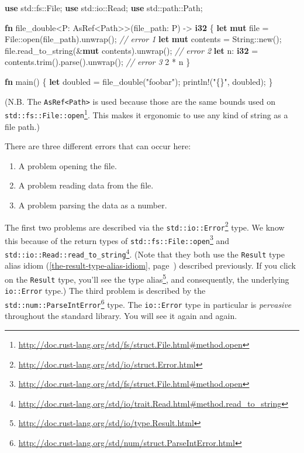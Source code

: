 \documentclass[a4paper,]{book}
\renewcommand*{\hyperref}[2][\ar]{%
  \def\ar{#2}%
  #2 (\autoref{#1}, page~\pageref{#1})}
\newenvironment{Shaded}{\begin{snugshade}}{\end{snugshade}}
\newcommand{\KeywordTok}[1]{\textcolor[rgb]{0.13,0.29,0.53}{\textbf{{#1}}}}
\newcommand{\DecValTok}[1]{\textcolor[rgb]{0.00,0.00,0.81}{{#1}}}
\newcommand{\StringTok}[1]{\textcolor[rgb]{0.31,0.60,0.02}{{#1}}}
\newcommand{\CommentTok}[1]{\textcolor[rgb]{0.56,0.35,0.01}{\textit{{#1}}}}
\newcommand{\OtherTok}[1]{\textcolor[rgb]{0.56,0.35,0.01}{{#1}}}
\newcommand{\NormalTok}[1]{{#1}}
\renewcommand{\href}[2]{#2\footnote{\url{#1}}}
\begin{document}
\begin{Shaded}
\begin{Highlighting}[]
\KeywordTok{use} \NormalTok{std::fs::File;}
\KeywordTok{use} \NormalTok{std::io::Read;}
\KeywordTok{use} \NormalTok{std::path::Path;}

\KeywordTok{fn} \NormalTok{file_double<P: AsRef<Path>>(file_path: P) -> }\KeywordTok{i32} \NormalTok{\{}
    \KeywordTok{let} \KeywordTok{mut} \NormalTok{file = File::open(file_path).unwrap(); }\CommentTok{// error 1}
    \KeywordTok{let} \KeywordTok{mut} \NormalTok{contents = String::new();}
    \NormalTok{file.read_to_string(&}\KeywordTok{mut} \NormalTok{contents).unwrap(); }\CommentTok{// error 2}
    \KeywordTok{let} \NormalTok{n: }\KeywordTok{i32} \NormalTok{= contents.trim().parse().unwrap(); }\CommentTok{// error 3}
    \DecValTok{2} \NormalTok{* n}
\NormalTok{\}}

\KeywordTok{fn} \NormalTok{main() \{}
    \KeywordTok{let} \NormalTok{doubled = file_double(}\StringTok{"foobar"}\NormalTok{);}
    \OtherTok{println!}\NormalTok{(}\StringTok{"\{\}"}\NormalTok{, doubled);}
\NormalTok{\}}
\end{Highlighting}
\end{Shaded}

(N.B. The \texttt{AsRef\textless{}Path\textgreater{}} is used because
those are the
\href{http://doc.rust-lang.org/std/fs/struct.File.html\#method.open}{same
bounds used on \texttt{std::fs::File::open}}. This makes it ergonomic to
use any kind of string as a file path.)

There are three different errors that can occur here:

\begin{enumerate}
\def\labelenumi{\arabic{enumi}.}
\itemsep1pt\parskip0pt
\item
  A problem opening the file.
\item
  A problem reading data from the file.
\item
  A problem parsing the data as a number.
\end{enumerate}

The first two problems are described via the
\href{http://doc.rust-lang.org/std/io/struct.Error.html}{\texttt{std::io::Error}}
type. We know this because of the return types of
\href{http://doc.rust-lang.org/std/fs/struct.File.html\#method.open}{\texttt{std::fs::File::open}}
and
\href{http://doc.rust-lang.org/std/io/trait.Read.html\#method.read_to_string}{\texttt{std::io::Read::read\_to\_string}}.
(Note that they both use the
\hyperref[the-result-type-alias-idiom]{\texttt{Result} type alias idiom}
described previously. If you click on the \texttt{Result} type, you'll
\href{http://doc.rust-lang.org/std/io/type.Result.html}{see the type
alias}, and consequently, the underlying \texttt{io::Error} type.) The
third problem is described by the
\href{http://doc.rust-lang.org/std/num/struct.ParseIntError.html}{\texttt{std::num::ParseIntError}}
type. The \texttt{io::Error} type in particular is \emph{pervasive}
throughout the standard library. You will see it again and again.
\end{document}

